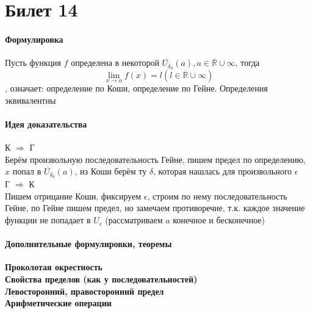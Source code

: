 \documentclass[a4paper,10pt]{article}
\begin{document}
	\section{Билет 14}
	\begin{center} 
		\item \paragraph{Формулировка} 
	\end{center}
	Пусть функция $f$ определена в некоторой $\dot{U_{\delta_{0}}}(a), a \in \overline{\mathbb{R}} \cup {\infty}$, тогда
	\[ \lim_{x \to a} f(x) = l (l \in \overline{\mathbb{R}} \cup {\infty}) \], означает: определение по Коши, определение по Гейне. Определения эквивалентны
	\begin{center} 
		\item \paragraph{Идея доказательства} 
	\end{center}
	К $\Rightarrow$ Г \\
	Берём произвольную последовательность Гейне, пишем предел по определению, $x$ попал в $\dot{U_{\delta_{0}}}(a)$, из Коши берём ту $\delta$, которая нашлась для произвольного $\epsilon$ \\
	Г $\Rightarrow$ К \\
	Пишем отрицание Коши, фиксируем $\epsilon$, строим по нему последовательность Гейне, по Гейне пишем предел, но замечаем противоречие, т.к. каждое значение функции не попадает в $U_{\epsilon}$ (рассматриваем $a$ конечное и бесконечное)
	\begin{center} 
		\item \paragraph{Дополнительные формулировки, теоремы} 
	\end{center}
	\textbf{Проколотая окрестность} \\
	\textbf{Свойства пределов (как у последовательностей)} \\
	\textbf{Левосторонний, правосторонний предел} \\
	\textbf{Арифметические операции}
\end{document}
